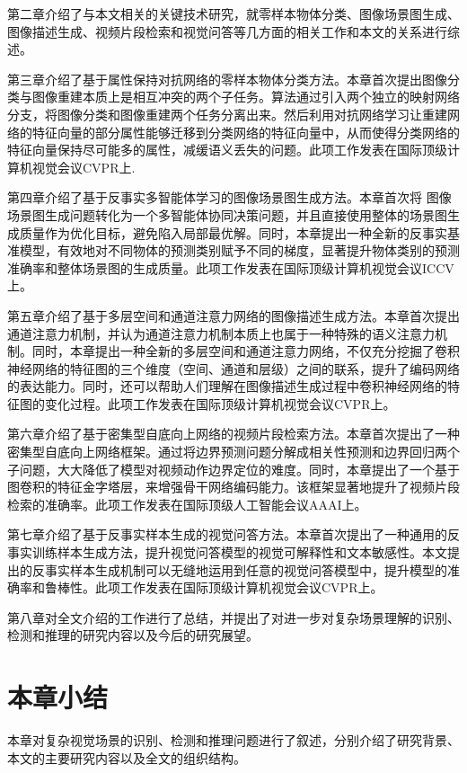 \begin{asparaitem}

\item 第二章介绍了与本文相关的关键技术研究，就零样本物体分类、图像场景图生成、图像描述生成、视频片段检索和视觉问答等几方面的相关工作和本文的关系进行综述。

\item 第三章介绍了基于属性保持对抗网络的零样本物体分类方法。本章首次提出图像分类与图像重建本质上是相互冲突的两个子任务。算法通过引入两个独立的映射网络分支，将图像分类和图像重建两个任务分离出来。然后利用对抗网络学习让重建网络的特征向量的部分属性能够迁移到分类网络的特征向量中，从而使得分类网络的特征向量保持尽可能多的属性，减缓语义丢失的问题。此项工作发表在国际顶级计算机视觉会议CVPR上.

\item 第四章介绍了基于反事实多智能体学习的图像场景图生成方法。本章首次将
图像场景图生成问题转化为一个多智能体协同决策问题，并且直接使用整体的场景图生成质量作为优化目标，避免陷入局部最优解。同时，本章提出一种全新的反事实基准模型，有效地对不同物体的预测类别赋予不同的梯度，显著提升物体类别的预测准确率和整体场景图的生成质量。此项工作发表在国际顶级计算机视觉会议ICCV上。

\item 第五章介绍了基于多层空间和通道注意力网络的图像描述生成方法。本章首次提出通道注意力机制，并认为通道注意力机制本质上也属于一种特殊的语义注意力机制。同时，本章提出一种全新的多层空间和通道注意力网络，不仅充分挖掘了卷积神经网络的特征图的三个维度（空间、通道和层级）之间的联系，提升了编码网络的表达能力。同时，还可以帮助人们理解在图像描述生成过程中卷积神经网络的特征图的变化过程。此项工作发表在国际顶级计算机视觉会议CVPR上。

\item 第六章介绍了基于密集型自底向上网络的视频片段检索方法。本章首次提出了一种密集型自底向上网络框架。通过将边界预测问题分解成相关性预测和边界回归两个子问题，大大降低了模型对视频动作边界定位的难度。同时，本章提出了一个基于图卷积的特征金字塔层，来增强骨干网络编码能力。该框架显著地提升了视频片段检索的准确率。此项工作发表在国际顶级人工智能会议AAAI上。

\item 第七章介绍了基于反事实样本生成的视觉问答方法。本章首次提出了一种通用的反事实训练样本生成方法，提升视觉问答模型的视觉可解释性和文本敏感性。本文提出的反事实样本生成机制可以无缝地运用到任意的视觉问答模型中，提升模型的准确率和鲁棒性。此项工作发表在国际顶级计算机视觉会议CVPR上。

\item 第八章对全文介绍的工作进行了总结，并提出了对进一步对复杂场景理解的识别、检测和推理的研究内容以及今后的研究展望。

\end{asparaitem}

\section{本章小结}
本章对复杂视觉场景的识别、检测和推理问题进行了叙述，分别介绍了研究背景、本文的主要研究内容以及全文的组织结构。

